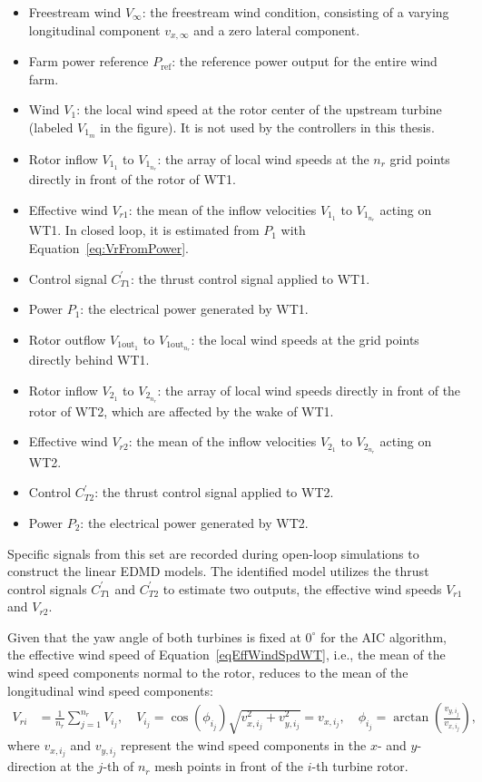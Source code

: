 \begin{itemize}
    \item Freestream wind $V_\infty$: the freestream wind condition, consisting of a varying longitudinal component $v_{x,\infty}$ and a zero lateral component.
    \item Farm power reference $P_{\text{ref}}$: the reference power output for the entire wind farm.
    \item Wind $V_1$: the local wind speed at the rotor center of the upstream turbine (labeled $V_{1_m}$ in the figure). It is not used by the controllers in this thesis.
    \item Rotor inflow $V_{1_1}$ to $V_{1_{n_r}}$: the array of local wind speeds at the $n_r$ grid points directly in front of the rotor of WT1.
    \item Effective wind $V_{r1}$: the mean of the inflow velocities $V_{1_1}$ to $V_{1_{n_r}}$ acting on WT1. In closed loop, it is estimated from $P_1$ with Equation~\eqref{eq:VrFromPower}.
    \item Control signal $C_{T1}^{\prime}$: the thrust control signal applied to WT1.
    \item Power $P_1$: the electrical power generated by WT1.
    \item Rotor outflow $V_{1\text{out}_1}$ to $V_{1\text{out}_{n_r}}$: the local wind speeds at the grid points directly behind WT1.
    \item Rotor inflow $V_{2_1}$ to $V_{2_{n_r}}$: the array of local wind speeds directly in front of the rotor of WT2, which are affected by the wake of WT1.
    \item Effective wind $V_{r2}$: the mean of the inflow velocities $V_{2_1}$ to $V_{2_{n_r}}$ acting on WT2.
    \item Control $C_{T2}^{\prime}$: the thrust control signal applied to WT2.
    \item Power $P_2$: the electrical power generated by WT2.
\end{itemize}
Specific signals from this set are recorded during open-loop simulations to construct the linear EDMD models. The identified model utilizes the thrust control signals $C_{T1}^{\prime}$ and $C_{T2}^{\prime}$ to estimate two outputs, the effective wind speeds $V_{r1}$ and $V_{r2}$.


Given that the yaw angle of both turbines is fixed at $0^\circ$ for the AIC algorithm, the effective wind speed of Equation~\eqref{eqEffWindSpdWT}, i.e., the mean of the wind speed components normal to the rotor, reduces to the mean of the longitudinal wind speed components:
\begin{align} \label{eqEffWindSpdWTAIC}
    V_{ri} &=  \frac{1}{n_r} \sum_{j = 1}^{n_r} V_{i_j},  
    \quad  V_{i_j} = \cos(\phi_{i_j}) \sqrt{v_{x,i_j}^2 + v_{y,i_j}^2} = v_{x,i_j},
    \quad \phi_{i_j} = \arctan\left(\frac{v_{y,i_j}}{v_{x,i_j}}\right),
\end{align}
where $v_{x,i_j}$ and $v_{y,i_j}$ represent the wind speed components in the $x$- and $y$-direction at the $j$-th of $n_r$ mesh points in front of the $i$-th turbine rotor.

